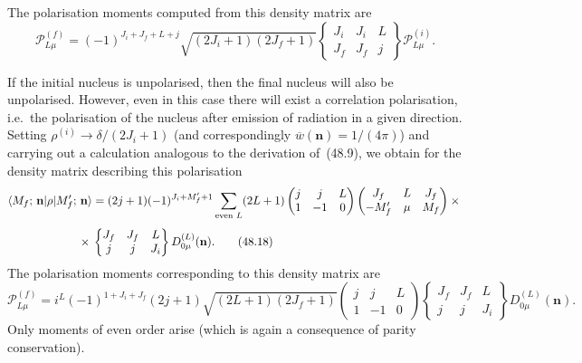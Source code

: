 The polarisation moments computed from this density matrix are
\begin{equation}
\mathcal{P}^{(f)}_{L\mu} = (-1)^{J_i+J_f+L+j}\sqrt{(2J_i+1)(2J_f+1)}\begin{Bmatrix} J_i & J_i & L \\ J_f & J_f & j\end{Bmatrix}\mathcal{P}^{(i)}_{L\mu}.
\tag{48.17}
\end{equation}

If the initial nucleus is unpolarised, then the final nucleus will also be unpolarised. However, even in this case there will exist a correlation polarisation, i.e.\ the polarisation of the nucleus after emission of radiation in a given direction. Setting $\rho^{(i)} \to \delta/(2J_i + 1)$ (and correspondingly $\overline{w}(\mathbf{n}) = 1/(4\pi)$) and carrying out a calculation analogous to the derivation of~(48.9), we obtain for the density matrix describing this polarisation
\begin{align}
\langle M_f;\,\mathbf{n}|\rho|M'_f;\,\mathbf{n}\rangle &= (2j+1)(-1)^{J_i+M'_f+1}\sum_{\text{even }L}(2L+1)\begin{pmatrix} j & j & L \\ 1 & -1 & 0\end{pmatrix}\begin{pmatrix} J_f & L & J_f \\ -M'_f & \mu & M_f\end{pmatrix}\times{}\notag\\[4pt]
{}\times{}&\begin{Bmatrix} J_f & J_f & L \\ j & j & J_i\end{Bmatrix}D^{(L)}_{0\mu}(\mathbf{n}).
\tag{48.18}
\end{align}
The polarisation moments corresponding to this density matrix are
\begin{equation}
\mathcal{P}^{(f)}_{L\mu} = i^L(-1)^{1+J_i+J_f}(2j+1)\sqrt{(2L+1)(2J_f+1)}\begin{pmatrix} j & j & L \\ 1 & -1 & 0\end{pmatrix}\begin{Bmatrix} J_f & J_f & L \\ j & j & J_i\end{Bmatrix}D^{(L)}_{0\mu}(\mathbf{n}).
\tag{48.19}
\end{equation}
Only moments of even order arise (which is again a consequence of parity conservation).

